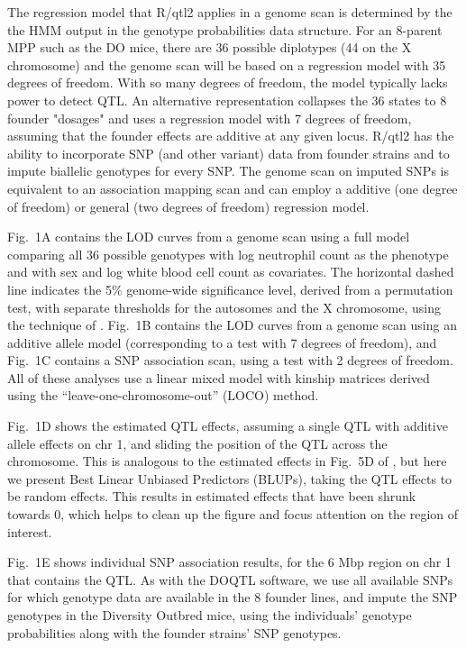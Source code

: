 \documentclass[12pt,letterpaper]{article}
\begin{document}
The regression model that R/qtl2 applies in a genome scan is determined by the
the HMM output in the genotype probabilities data structure.
For an 8-parent MPP such as the DO mice, there are 36 possible diplotypes
(44 on the X chromosome) and the genome scan will be based on a
regression model with 35 degrees of freedom.
With so many degrees of freedom, the model typically lacks power to detect QTL.
An alternative representation collapses the 36 states to 8 founder "dosages"
and uses a regression model with 7 degrees of freedom, assuming that the founder effects are additive at any given locus.
R/qtl2 has the ability to incorporate SNP (and other variant) data from founder strains and
to impute biallelic genotypes for every SNP.  The genome scan on imputed SNPs is
equivalent to an association mapping scan and can employ a additive
(one degree of freedom) or general (two degrees of freedom)
regression model.

Fig.~1A contains the LOD curves from a genome scan using a full model
comparing all 36 possible genotypes
with log neutrophil count as the phenotype and with sex and log white blood
cell count as covariates. The horizontal dashed line indicates the 5\%
genome-wide significance level, derived from a permutation test,
with separate thresholds for the autosomes and the X chromosome, using
the technique of \citet{broman2006}. Fig.~1B contains the LOD curves
from a genome scan using an additive allele model (corresponding to a
test with 7 degrees of freedom), and Fig.~1C contains a SNP
association scan, using a test with 2 degrees of freedom. All of these
analyses use a linear mixed model with kinship matrices derived using
the ``leave-one-chromosome-out'' (LOCO) method.

Fig.~1D shows the estimated QTL effects, assuming a single QTL with
additive allele effects on chr 1, and sliding the position of the QTL
across the chromosome. This is analogous to the estimated effects in
Fig.~5D of \citet{gatti2014}, but here we present Best Linear Unbiased
Predictors (BLUPs), taking the QTL effects to be random effects. This
results in estimated effects that have been shrunk towards 0, which
helps to clean up the figure and focus attention on the region of
interest.

Fig.~1E shows individual SNP association results, for the 6 Mbp region
on chr 1 that contains the QTL. As with the DOQTL software, we use all
available SNPs for which genotype data are available in the 8 founder
lines, and impute the SNP genotypes in the Diversity Outbred mice, using the
individuals' genotype probabilities along with the founder strains'
SNP genotypes.
\end{document}
